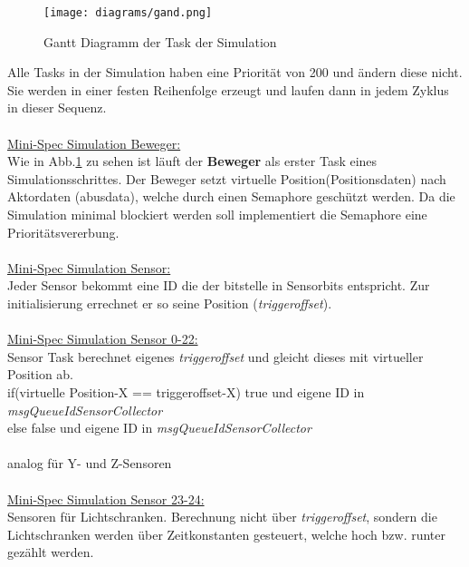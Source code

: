 \begin{figure}[H]
	\centering
  \texttt{[image: diagrams/gand.png]}
	\caption{Gantt Diagramm der Task der Simulation}
	\label{gantt}
\end{figure}

Alle Tasks in der Simulation haben eine Priorität von 200 und ändern diese nicht. Sie werden in einer festen Reihenfolge erzeugt und laufen dann in jedem Zyklus in dieser Sequenz.\\
\\

\underline{Mini-Spec Simulation Beweger:}\\
Wie in Abb.\ref{gantt} zu sehen ist läuft der \textbf{Beweger} als erster Task eines Simulationsschrittes.
Der Beweger setzt virtuelle Position(Positionsdaten) nach Aktordaten (abusdata), welche durch einen Semaphore geschützt werden.  Da die Simulation minimal blockiert werden soll implementiert die Semaphore eine Prioritätsvererbung.\\ \\


\underline{Mini-Spec Simulation Sensor:}\\
Jeder Sensor bekommt eine ID die der bitstelle in Sensorbits entspricht. Zur initialisierung errechnet er so seine Position (\textit{triggeroffset}).\\ \\

\underline{Mini-Spec Simulation Sensor 0-22:}\\
Sensor Task berechnet eigenes \textit{triggeroffset} und gleicht dieses mit virtueller Position ab.\\
if(virtuelle Position-X == triggeroffset-X) true und eigene ID in \textit{msgQueueIdSensorCollector\\}
else false und eigene ID in \textit{msgQueueIdSensorCollector\\} \\
analog für Y- und Z-Sensoren\\ \\

\underline{Mini-Spec Simulation Sensor 23-24:}\\
Sensoren für Lichtschranken. Berechnung nicht über \textit{triggeroffset}, sondern die Lichtschranken werden über Zeitkonstanten gesteuert, welche hoch bzw. runter gezählt werden.\\


